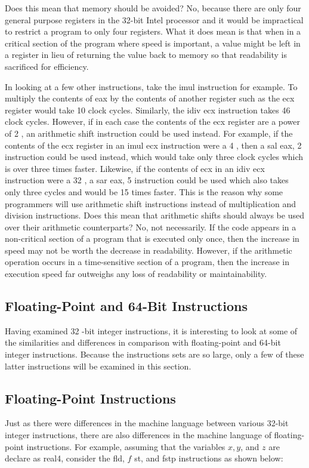 \documentclass[10pt]{book}
\begin{document}
Does this mean that memory should be avoided? No, because there are only four general purpose registers in the 32-bit Intel processor and it would be impractical to restrict a program to only four registers. What it does mean is that when in a critical section of the program where speed is important, a value might be left in a register in lieu of returning the value back to memory so that readability is sacrificed for efficiency.

In looking at a few other instructions, take the imul instruction for example. To multiply the contents of eax by the contents of another register such as the ecx register would take 10 clock cycles. Similarly, the idiv ecx instruction takes 46 clock cycles. However, if in each case the contents of the ecx register are a power of 2 , an arithmetic shift instruction could be used instead. For example, if the contents of the ecx register in an imul ecx instruction were a 4 , then a sal eax, 2 instruction could be used instead, which would take only three clock cycles which is over three times faster. Likewise, if the contents of ecx in an idiv ecx instruction were a 32 , a sar eax, 5 instruction could be used which also takes only three cycles and would be 15 times faster. This is the reason why some programmers will use arithmetic shift instructions instead of multiplication and division instructions. Does this mean that arithmetic shifts should always be used over their arithmetic counterparts? No, not necessarily. If the code appears in a non-critical section of a program that is executed only once, then the increase in speed may not be worth the decrease in readability. However, if the arithmetic operation occurs in a time-sensitive section of a program, then the increase in execution speed far outweighs any loss of readability or maintainability.

\subsection{Floating-Point and 64-Bit Instructions}
Having examined 32 -bit integer instructions, it is interesting to look at some of the similarities and differences in comparison with floating-point and 64-bit integer instructions. Because the instructions sets are so large, only a few of these latter instructions will be examined in this section.

\subsection{Floating-Point Instructions}
Just as there were differences in the machine language between various 32-bit integer instructions, there are also differences in the machine language of floating-point instructions. For example, assuming that the variables $x, y$, and $z$ are declare as real4, consider the fld, $f$ st, and fstp instructions as shown below:
\end{document}
